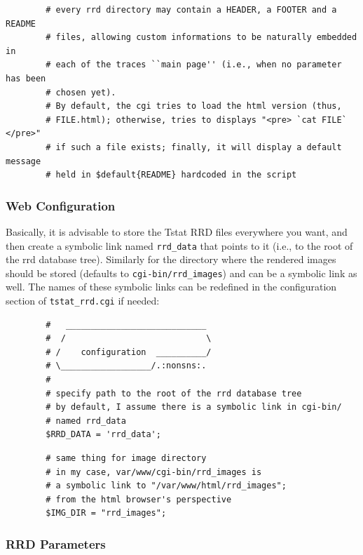 \documentclass[11pt]{article}
\begin{document}
\begin{small}\begin{verbatim}
        # every rrd directory may contain a HEADER, a FOOTER and a README
        # files, allowing custom informations to be naturally embedded in
        # each of the traces ``main page'' (i.e., when no parameter has been
        # chosen yet).
        # By default, the cgi tries to load the html version (thus,
        # FILE.html); otherwise, tries to displays "<pre> `cat FILE` </pre>"
        # if such a file exists; finally, it will display a default message
        # held in $default{README} hardcoded in the script
\end{verbatim}\end{small} \noindent
\subsubsection{Web Configuration\label{Web_Configuration}}


Basically, it is advisable to store the Tstat RRD files
everywhere you want, and then create a symbolic link 
named \texttt{rrd\_data} that points to it (i.e., to the root of 
the rrd database tree). Similarly for the directory
where the rendered images should be stored (defaults to \texttt{cgi-bin/rrd\_images})
and can be a symbolic link as well.
The names of these symbolic links can be redefined in the 
configuration section of \texttt{tstat\_rrd.cgi} if needed:

\begin{small}\begin{verbatim}
        #   ____________________________
        #  /                            \
        # /    configuration  __________/
        # \__________________/.:nonsns:.
        #
        # specify path to the root of the rrd database tree
        # by default, I assume there is a symbolic link in cgi-bin/
        # named rrd_data
        $RRD_DATA = 'rrd_data';
\end{verbatim}\end{small} \noindent
\begin{small}\begin{verbatim}
        # same thing for image directory
        # in my case, var/www/cgi-bin/rrd_images is
        # a symbolic link to "/var/www/html/rrd_images";
        # from the html browser's perspective
        $IMG_DIR = "rrd_images";
\end{verbatim}\end{small} \noindent
\subsubsection{RRD Parameters\label{RRD_Parameters}}
\end{document}
